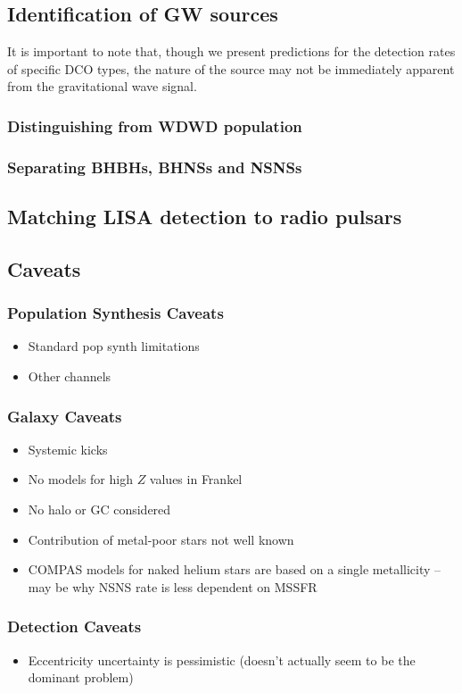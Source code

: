 \subsection{Identification of GW sources}
It is important to note that, though we present predictions for the detection rates of specific DCO types, the nature of the source may not be immediately apparent from the gravitational wave signal.

\subsubsection{Distinguishing from WDWD population}
\subsubsection{Separating BHBHs, BHNSs and NSNSs}

\subsection{Matching LISA detection to radio pulsars}\label{sec:pulsar_matching}

\subsection{Caveats}\label{sec:caveats}

\subsubsection{Population Synthesis Caveats}
\begin{itemize}
    \item Standard pop synth limitations
    \item Other channels
\end{itemize}

\subsubsection{Galaxy Caveats}
\begin{itemize}
    \item Systemic kicks
    \item No models for high $Z$ values in Frankel
    \item No halo or GC considered %
    \item Contribution of metal-poor stars not well known
    \item COMPAS models for naked helium stars are based on a single metallicity -- may be why NSNS rate is less dependent on MSSFR
\end{itemize}

\subsubsection{Detection Caveats}
\begin{itemize}
    \item Eccentricity uncertainty is pessimistic (doesn't actually seem to be the dominant problem)
\end{itemize}